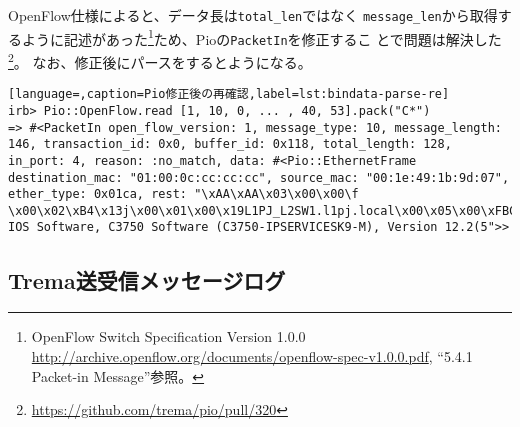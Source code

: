 OpenFlow仕様によると、データ長は\verb|total_len|ではなく
\verb|message_len|から取得するように記述があった\footnote{OpenFlow
Switch Specification Version 1.0.0
\url{http://archive.openflow.org/documents/openflow-spec-v1.0.0.pdf},
``5.4.1 Packet-in Message''参照。}ため、Pioの\verb|PacketIn|を修正するこ
とで問題は解決した\footnote{\url{https://github.com/trema/pio/pull/320}}。
なお、修正後にパースをするとようになる。

\begin{lstlisting}[language=,caption=Pio修正後の再確認,label=lst:bindata-parse-re]
irb> Pio::OpenFlow.read [1, 10, 0, ... , 40, 53].pack("C*")
=> #<PacketIn open_flow_version: 1, message_type: 10, message_length: 146, transaction_id: 0x0, buffer_id: 0x118, total_length: 128, in_port: 4, reason: :no_match, data: #<Pio::EthernetFrame destination_mac: "01:00:0c:cc:cc:cc", source_mac: "00:1e:49:1b:9d:07", ether_type: 0x01ca, rest: "\xAA\xAA\x03\x00\x00\f \x00\x02\xB4\x13j\x00\x01\x00\x19L1PJ_L2SW1.l1pj.local\x00\x05\x00\xFBCisco IOS Software, C3750 Software (C3750-IPSERVICESK9-M), Version 12.2(5">>
\end{lstlisting}

  \subsection{Trema送受信メッセージログ}


